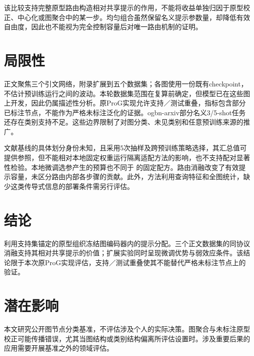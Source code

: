 该比较支持完整原型路由构造相对共享提示的作用，不能将收益单独归因于原型校正、中心化或图聚合中的某一步。均匀组合虽然保留名义提示参数量，却降低有效自由度，因此也不能视为完全控制容量后对唯一路由机制的证明。

\section{局限性}
正文聚焦三个引文网络，附录扩展到五个数据集；各图使用一份既有checkpoint，不估计预训练运行之间的波动。本轮数据集范围在复算前确定，但模型已在这些图上开发，因此仍属描述性分析。原ProG实现允许支持／测试重叠，指标包含部分已标注节点，不能作为严格未标注泛化的证据。ogbn-arxiv部分名义3/5-shot任务还存在类别支持不足。这些边界限制了对图分类、未见类别和任意预训练来源的推广。

文献基线的具体划分身份未知，且采用5次抽样及跨预训练策略选择，其汇总值可提供参照，但不能相对本地固定权重运行隔离适配方法的影响，也不支持配对显著性检验。本地微调选参产生的预算也不同于 \method 的固定配方。路由消融改变了有效提示容量，未区分路由内部各步骤的贡献。此外，方法利用查询特征和全图统计，缺少这类传导式信息的部署条件需另行评估。

\section{结论}
\method 利用支持集锚定的原型组织冻结图编码器内的提示分配。三个正文数据集的同协议消融支持其相对共享提示的价值；扩展实验同时呈现微调优势与弱效应条件。该结论限于本次原ProG实现评估，支持／测试重叠使其不能替代严格未标注节点上的验证。

\section*{潜在影响}
本文研究公开图节点分类基准，不评估涉及个人的实际决策。图聚合与未标注原型校正可能传播错误，尤其当图结构或类别结构偏离所评估设置时。涉及重要后果的应用需要开展基准之外的领域评估。
